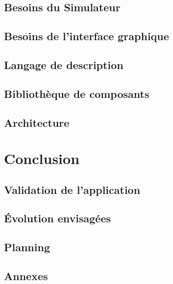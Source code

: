 \documentclass{scrreprt}
\begin{document}
\section{Besoins du Simulateur}


\newpage
\section{Besoins de l'interface graphique}


\newpage
\section{Langage de description}


\newpage
\section{Bibliothèque de composants}


\newpage
\section{Architecture}

\newpage



\newpage
\chapter{Conclusion}

\section{Validation de l'application}


\section{Évolution envisagées}


\section{Planning}


\newpage
\section{Annexes}

\end{document}
